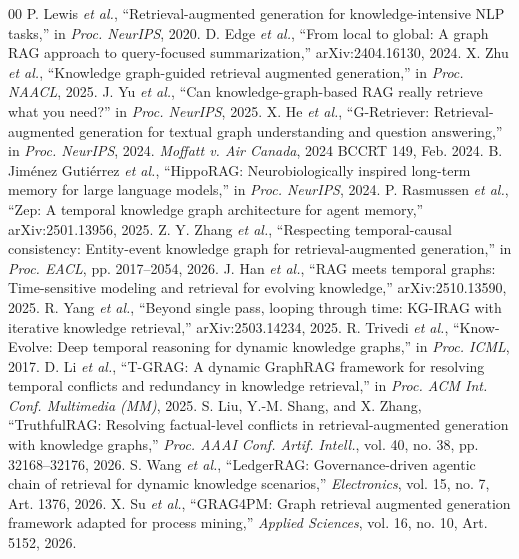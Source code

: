 \documentclass[conference]{IEEEtran}
\begin{document}
\balance
\begin{thebibliography}{00}
 P. Lewis \emph{et al.}, ``Retrieval-augmented generation for knowledge-intensive NLP tasks,'' in \emph{Proc. NeurIPS}, 2020.
 D. Edge \emph{et al.}, ``From local to global: A graph RAG approach to query-focused summarization,'' arXiv:2404.16130, 2024.
 X. Zhu \emph{et al.}, ``Knowledge graph-guided retrieval augmented generation,'' in \emph{Proc. NAACL}, 2025.
 J. Yu \emph{et al.}, ``Can knowledge-graph-based RAG really retrieve what you need?'' in \emph{Proc. NeurIPS}, 2025.
 X. He \emph{et al.}, ``G-Retriever: Retrieval-augmented generation for textual graph understanding and question answering,'' in \emph{Proc. NeurIPS}, 2024.
 \emph{Moffatt v. Air Canada}, 2024 BCCRT 149, Feb. 2024.
 B. Jim\'enez Guti\'errez \emph{et al.}, ``HippoRAG: Neurobiologically inspired long-term memory for large language models,'' in \emph{Proc. NeurIPS}, 2024.
 P. Rasmussen \emph{et al.}, ``Zep: A temporal knowledge graph architecture for agent memory,'' arXiv:2501.13956, 2025.
 Z. Y. Zhang \emph{et al.}, ``Respecting temporal-causal consistency: Entity-event knowledge graph for retrieval-augmented generation,'' in \emph{Proc. EACL}, pp. 2017--2054, 2026.
 J. Han \emph{et al.}, ``RAG meets temporal graphs: Time-sensitive modeling and retrieval for evolving knowledge,'' arXiv:2510.13590, 2025.
 R. Yang \emph{et al.}, ``Beyond single pass, looping through time: KG-IRAG with iterative knowledge retrieval,'' arXiv:2503.14234, 2025.
 R. Trivedi \emph{et al.}, ``Know-Evolve: Deep temporal reasoning for dynamic knowledge graphs,'' in \emph{Proc. ICML}, 2017.
 D. Li \emph{et al.}, ``T-GRAG: A dynamic GraphRAG framework for resolving temporal conflicts and redundancy in knowledge retrieval,'' in \emph{Proc. ACM Int. Conf. Multimedia (MM)}, 2025.
 S. Liu, Y.-M. Shang, and X. Zhang, ``TruthfulRAG: Resolving factual-level conflicts in retrieval-augmented generation with knowledge graphs,'' \emph{Proc. AAAI Conf. Artif. Intell.}, vol. 40, no. 38, pp. 32168--32176, 2026.
 S. Wang \emph{et al.}, ``LedgerRAG: Governance-driven agentic chain of retrieval for dynamic knowledge scenarios,'' \emph{Electronics}, vol. 15, no. 7, Art. 1376, 2026.
 X. Su \emph{et al.}, ``GRAG4PM: Graph retrieval augmented generation framework adapted for process mining,'' \emph{Applied Sciences}, vol. 16, no. 10, Art. 5152, 2026.

\end{thebibliography}
\end{document}
